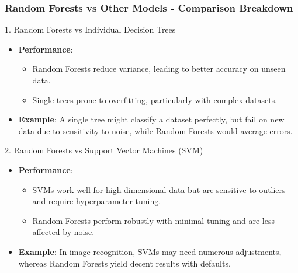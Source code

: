 \documentclass[aspectratio=169]{beamer}
\begin{document}
\begin{frame}[fragile]
  \frametitle{Random Forests vs Other Models - Comparison Breakdown}
  
  \begin{block}{1. Random Forests vs Individual Decision Trees}
    \begin{itemize}
      \item \textbf{Performance}:
      \begin{itemize}
        \item Random Forests reduce variance, leading to better accuracy on unseen data.
        \item Single trees prone to overfitting, particularly with complex datasets.
      \end{itemize}
      \item \textbf{Example}: A single tree might classify a dataset perfectly, but fail on new data due to sensitivity to noise, while Random Forests would average errors.
    \end{itemize}
  \end{block}
  
  \begin{block}{2. Random Forests vs Support Vector Machines (SVM)}
    \begin{itemize}
      \item \textbf{Performance}:
      \begin{itemize}
        \item SVMs work well for high-dimensional data but are sensitive to outliers and require hyperparameter tuning.
        \item Random Forests perform robustly with minimal tuning and are less affected by noise.
      \end{itemize}
      \item \textbf{Example}: In image recognition, SVMs may need numerous adjustments, whereas Random Forests yield decent results with defaults.
    \end{itemize}
  \end{block}
\end{frame}
\end{document}
